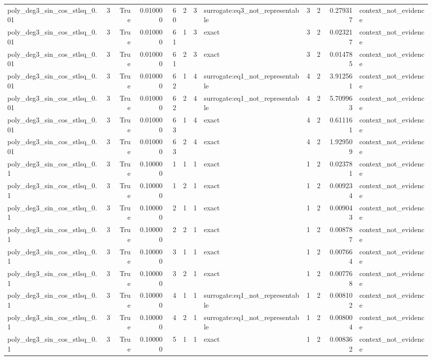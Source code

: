 \begin{tabular}{lrrrrrrlrrrl}
poly\_deg3\_sin\_cos\_stlsq\_0.01 & 3 & True & 0.010000 & 60 & 2 & 3 & surrogate:eq3\_not\_representable & 3 & 2 & 0.279317 & context\_not\_evidence \\
poly\_deg3\_sin\_cos\_stlsq\_0.01 & 3 & True & 0.010000 & 61 & 1 & 3 & exact & 3 & 2 & 0.023217 & context\_not\_evidence \\
poly\_deg3\_sin\_cos\_stlsq\_0.01 & 3 & True & 0.010000 & 61 & 2 & 3 & exact & 3 & 2 & 0.014785 & context\_not\_evidence \\
poly\_deg3\_sin\_cos\_stlsq\_0.01 & 3 & True & 0.010000 & 62 & 1 & 4 & surrogate:eq1\_not\_representable & 4 & 2 & 3.912561 & context\_not\_evidence \\
poly\_deg3\_sin\_cos\_stlsq\_0.01 & 3 & True & 0.010000 & 62 & 2 & 4 & surrogate:eq1\_not\_representable & 4 & 2 & 5.709963 & context\_not\_evidence \\
poly\_deg3\_sin\_cos\_stlsq\_0.01 & 3 & True & 0.010000 & 63 & 1 & 4 & exact & 4 & 2 & 0.611161 & context\_not\_evidence \\
poly\_deg3\_sin\_cos\_stlsq\_0.01 & 3 & True & 0.010000 & 63 & 2 & 4 & exact & 4 & 2 & 1.929509 & context\_not\_evidence \\
poly\_deg3\_sin\_cos\_stlsq\_0.1 & 3 & True & 0.100000 & 1 & 1 & 1 & exact & 1 & 2 & 0.023781 & context\_not\_evidence \\
poly\_deg3\_sin\_cos\_stlsq\_0.1 & 3 & True & 0.100000 & 1 & 2 & 1 & exact & 1 & 2 & 0.009234 & context\_not\_evidence \\
poly\_deg3\_sin\_cos\_stlsq\_0.1 & 3 & True & 0.100000 & 2 & 1 & 1 & exact & 1 & 2 & 0.009043 & context\_not\_evidence \\
poly\_deg3\_sin\_cos\_stlsq\_0.1 & 3 & True & 0.100000 & 2 & 2 & 1 & exact & 1 & 2 & 0.008787 & context\_not\_evidence \\
poly\_deg3\_sin\_cos\_stlsq\_0.1 & 3 & True & 0.100000 & 3 & 1 & 1 & exact & 1 & 2 & 0.007664 & context\_not\_evidence \\
poly\_deg3\_sin\_cos\_stlsq\_0.1 & 3 & True & 0.100000 & 3 & 2 & 1 & exact & 1 & 2 & 0.007768 & context\_not\_evidence \\
poly\_deg3\_sin\_cos\_stlsq\_0.1 & 3 & True & 0.100000 & 4 & 1 & 1 & surrogate:eq1\_not\_representable & 1 & 2 & 0.008102 & context\_not\_evidence \\
poly\_deg3\_sin\_cos\_stlsq\_0.1 & 3 & True & 0.100000 & 4 & 2 & 1 & surrogate:eq1\_not\_representable & 1 & 2 & 0.008004 & context\_not\_evidence \\
poly\_deg3\_sin\_cos\_stlsq\_0.1 & 3 & True & 0.100000 & 5 & 1 & 1 & exact & 1 & 2 & 0.008362 & context\_not\_evidence \\

\end{tabular}
